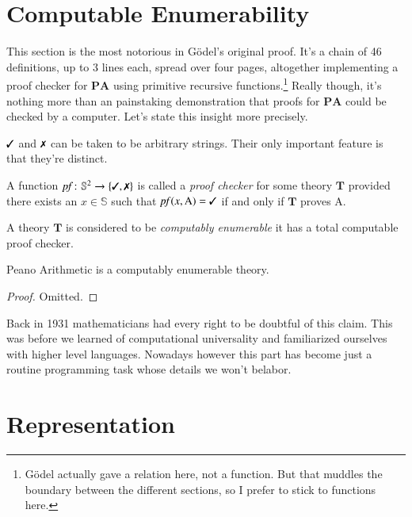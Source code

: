 \documentclass{article}
\theoremstyle{customstyle}
\newenvironment{prf}{\begin{mdframed}[skipabove=5pt, skipbelow=0pt, backgroundcolor=Gray!10, topline=false, bottomline=false, leftline=false, rightline=false]\begin{proof}}{\end{proof}\end{mdframed}}
\DeclareMathOperator{\pf}{\mathit{pf}}
\newcommand{\T}{\mathbf{T}}
\newcommand{\PA}{\mathbf{PA}}
\newcommand{\cmark}{\text{\small \ding{51}}}
\newcommand{\xmark}{\text{\small \ding{55}}}
\begin{document}
\section{Computable Enumerability}

This section is the most notorious in Gödel's original proof. It's a chain of 46 definitions, up to 3 lines each, spread over four pages, altogether implementing a proof checker for $\PA$ using primitive recursive functions.\footnote{Gödel actually gave a relation here, not a function. But that muddles the boundary between the different sections, so I prefer to stick to functions here.} Really though, it's nothing more than an painstaking demonstration that proofs for $\PA$ could be checked by a computer. Let's state this insight more precisely.

\begin{definition}
$\cmark$ and $\xmark$ can be taken to be arbitrary strings. Their only important feature is that they're distinct.
\end{definition}

\begin{definition}
A function $\pf \colon \mathbb{S}^2 \to \{\cmark, \xmark\}$ is called a \emph{proof checker} for some theory $\T$ provided there exists an $x \in \mathbb{S}$ such that $\pf(x, \mathrm{A}) = \cmark$ if and only if $\T$ proves $\mathrm{A}$.
\end{definition}

\begin{definition}
A theory $\T$ is considered to be \textit{computably enumerable} it has a total computable proof checker.
\end{definition}

\begin{theorem}
Peano Arithmetic is a computably enumerable theory.
\end{theorem}

\begin{prf}
Omitted.
\end{prf}

Back in 1931 mathematicians had every right to be doubtful of this claim. This was before we learned of computational universality and familiarized ourselves with higher level languages. Nowadays however this part has become just a routine programming task whose details we won't belabor.

\section{Representation}
\end{document}
